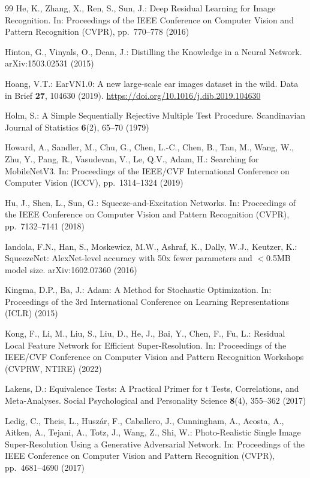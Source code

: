 \documentclass[11pt]{article}
\begin{document}
\begin{thebibliography}{99}
He, K., Zhang, X., Ren, S., Sun, J.:
Deep Residual Learning for Image Recognition.
In: Proceedings of the IEEE Conference on Computer Vision and Pattern Recognition (CVPR), pp.\ 770--778 (2016)

Hinton, G., Vinyals, O., Dean, J.:
Distilling the Knowledge in a Neural Network.
arXiv:1503.02531 (2015)

Hoang, V.T.:
EarVN1.0: A new large-scale ear images dataset in the wild.
Data in Brief \textbf{27}, 104630 (2019). \url{https://doi.org/10.1016/j.dib.2019.104630}

Holm, S.:
A Simple Sequentially Rejective Multiple Test Procedure.
Scandinavian Journal of Statistics \textbf{6}(2), 65--70 (1979)

Howard, A., Sandler, M., Chu, G., Chen, L.-C., Chen, B., Tan, M., Wang, W., Zhu, Y., Pang, R., Vasudevan, V., Le, Q.V., Adam, H.:
Searching for MobileNetV3.
In: Proceedings of the IEEE/CVF International Conference on Computer Vision (ICCV), pp.\ 1314--1324 (2019)

Hu, J., Shen, L., Sun, G.:
Squeeze-and-Excitation Networks.
In: Proceedings of the IEEE Conference on Computer Vision and Pattern Recognition (CVPR), pp.\ 7132--7141 (2018)

Iandola, F.N., Han, S., Moskewicz, M.W., Ashraf, K., Dally, W.J., Keutzer, K.:
SqueezeNet: AlexNet-level accuracy with 50x fewer parameters and $<$0.5MB model size.
arXiv:1602.07360 (2016)

Kingma, D.P., Ba, J.:
Adam: A Method for Stochastic Optimization.
In: Proceedings of the 3rd International Conference on Learning Representations (ICLR) (2015)

Kong, F., Li, M., Liu, S., Liu, D., He, J., Bai, Y., Chen, F., Fu, L.:
Residual Local Feature Network for Efficient Super-Resolution.
In: Proceedings of the IEEE/CVF Conference on Computer Vision and Pattern Recognition Workshops (CVPRW, NTIRE) (2022)

Lakens, D.:
Equivalence Tests: A Practical Primer for t Tests, Correlations, and Meta-Analyses.
Social Psychological and Personality Science \textbf{8}(4), 355--362 (2017)

Ledig, C., Theis, L., Husz\'ar, F., Caballero, J., Cunningham, A., Acosta, A., Aitken, A., Tejani, A., Totz, J., Wang, Z., Shi, W.:
Photo-Realistic Single Image Super-Resolution Using a Generative Adversarial Network.
In: Proceedings of the IEEE Conference on Computer Vision and Pattern Recognition (CVPR), pp.\ 4681--4690 (2017)


\end{thebibliography}
\end{document}
